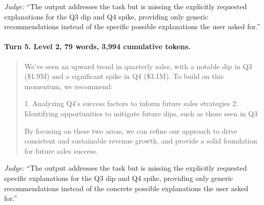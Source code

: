 \noindent\textit{Judge:} ``The output addresses the task but is missing the explicitly requested explanations for the Q3 dip and Q4 spike, providing only generic recommendations instead of the specific possible explanations the user asked for.''

\paragraph{Turn 5. Level 2, 79 words, 3,994 cumulative tokens.}

\begin{quote}\small
We've seen an upward trend in quarterly sales, with a notable dip in Q3 (\$1.9M) and a significant spike in Q4 (\$3.1M). To build on this momentum, we recommend:

1. Analyzing Q4's success factors to inform future sales strategies
2. Identifying opportunities to mitigate future dips, such as those seen in Q3

By focusing on these two areas, we can refine our approach to drive consistent and sustainable revenue growth, and provide a solid foundation for future sales success.
\end{quote}

\noindent\textit{Judge:} ``The output addresses the task but is missing the explicitly requested specific explanations for the Q3 dip and Q4 spike, providing only generic recommendations instead of the concrete possible explanations the user asked for.''

